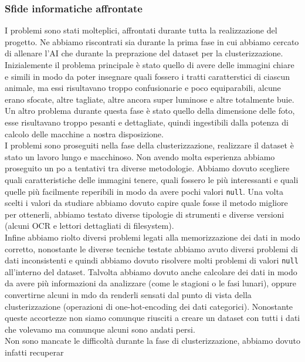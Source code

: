 \documentclass[12pt,a4paper,twoside]{article}
\begin{document}
\subsubsection{Sfide informatiche affrontate}
I problemi sono stati molteplici, affrontati durante tutta la realizzazione del progetto. Ne 
abbiamo riscontrati sia durante la prima fase in cui abbiamo cercato di allenare l'AI che durante 
la preprazione del dataset per la clusterizzazione.\\
Inizialemente il problema principale è stato quello di avere delle immagini chiare e simili in 
modo da poter insegnare quali fossero i tratti caratterstici di ciascun animale, ma essi 
risultavano troppo confusionarie e poco equiparabili, alcune erano sfocate, altre tagliate, altre 
ancora super luminose e altre totalmente buie. Un altro problema durante questa fase è stato 
quello della dimensione delle foto, esse risultavano troppo pesanti e dettagliate, quindi 
ingestibili dalla potenza di calcolo delle macchine a nostra disposizione.\\
I problemi sono proseguiti nella fase della clusterizzazione, realizzare il dataset è stato un 
lavoro lungo e macchinoso. Non avendo molta esperienza abbiamo proseguito un po a tentativi tra 
diverse metodologie. Abbiamo dovuto scegliere quali caratteristiche delle immagini tenere, quali 
fossero le più interessanti e quali quelle più facilmente reperibili in modo da avere pochi valori 
\texttt{null}. Una volta scelti i valori da studiare abbiamo dovuto capire quale fosse il metodo 
migliore per ottenerli, abbiamo testato diverse tipologie di strumenti e diverse versioni (alcuni 
OCR e lettori dettagliati di filesystem).\\
Infine abbiamo riolto diversi problemi legati alla memorizzazione dei dati in modo corretto, 
nonostante le diverse tecniche testate abbiamo avuto diversi problemi di dati inconsistenti e 
quindi abbiamo dovuto risolvere molti problemi di valori \texttt{null} all'interno del dataset. 
Talvolta abbiamo dovuto anche calcolare dei dati in modo da avere più informazioni da analizzare 
(come le stagioni o le fasi lunari), oppure convertirne alcuni in mdo da renderli sensati dal 
punto di vista della clusterizzazione (operazioni di one-hot-encoding dei dati categorici). 
Nonostante queste accortezze non siamo comunque riusciti a creare un dataset con tutti i dati che 
volevamo ma comunque alcuni sono andati persi.\\
Non sono mancate le difficoltà durante la fase di clusterizzazione, abbiamo dovuto infatti 
recuperar 
\end{document}
